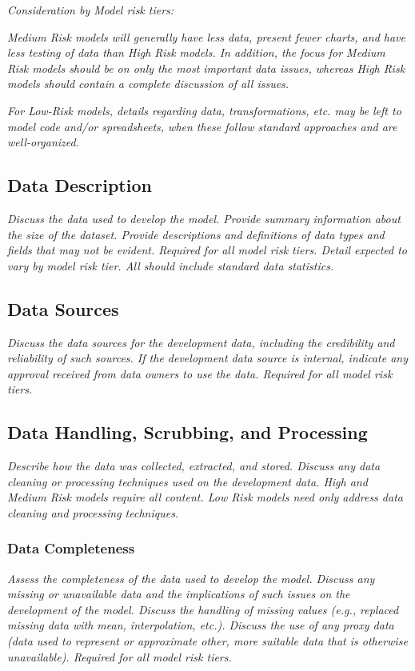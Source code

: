 \documentclass[12pt,letterpaper]{article}
\begin{document}
\textit{Consideration by Model risk tiers:}

\textit{Medium Risk models will generally have less data, present fewer charts, and have less testing of data than High Risk models. In addition, the focus for Medium Risk models should be on only the most important data issues, whereas High Risk models should contain a complete discussion of all issues.}

\textit{For Low-Risk models, details regarding data, transformations, etc. may be left to model code and/or spreadsheets, when these follow standard approaches and are well-organized.}

\subsection{Data Description}
\textit{Discuss the data used to develop the model. Provide summary information about the size of the dataset. Provide descriptions and definitions of data types and fields that may not be evident. Required for all model risk tiers. Detail expected to vary by model risk tier. All should include standard data statistics.}

\subsection{Data Sources}
\textit{Discuss the data sources for the development data, including the credibility and reliability of such sources. If the development data source is internal, indicate any approval received from data owners to use the data. Required for all model risk tiers.}

\subsection{Data Handling, Scrubbing, and Processing}
\textit{Describe how the data was collected, extracted, and stored. Discuss any data cleaning or processing techniques used on the development data. High and Medium Risk models require all content. Low Risk models need only address data cleaning and processing techniques.}

\subsubsection{Data Completeness}
\textit{Assess the completeness of the data used to develop the model. Discuss any missing or unavailable data and the implications of such issues on the development of the model. Discuss the handling of missing values (e.g., replaced missing data with mean, interpolation, etc.). Discuss the use of any proxy data (data used to represent or approximate other, more suitable data that is otherwise unavailable). Required for all model risk tiers.}
\end{document}
